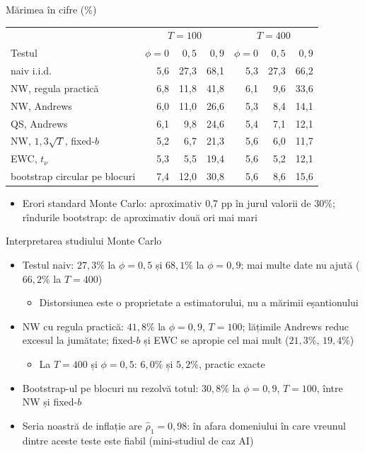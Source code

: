 \begin{frame}{Mărimea în cifre (\%)}
\itemsize{\footnotesize}
\begin{center}
\footnotesize
\begin{tabular}{lrrrrrr}
\toprule
& \multicolumn{3}{c}{$T = 100$} & \multicolumn{3}{c}{$T = 400$} \\
Testul & $\phi = 0$ & $0{,}5$ & $0{,}9$ & $\phi = 0$ & $0{,}5$ & $0{,}9$ \\
\midrule
naiv i.i.d. & 5{,}6 & 27{,}3 & 68{,}1 & 5{,}3 & 27{,}3 & 66{,}2 \\
NW, regula practică & 6{,}8 & 11{,}8 & 41{,}8 & 6{,}1 & 9{,}6 & 33{,}6 \\
NW, Andrews & 6{,}0 & 11{,}0 & 26{,}6 & 5{,}3 & 8{,}4 & 14{,}1 \\
QS, Andrews & 6{,}1 & 9{,}8 & 24{,}6 & 5{,}4 & 7{,}1 & 12{,}1 \\
NW, $1{,}3\sqrt{T}$, fixed-$b$ & 5{,}2 & 6{,}7 & 21{,}3 & 5{,}6 & 6{,}0 & 11{,}7 \\
EWC, $t_\nu$ & 5{,}3 & 5{,}5 & 19{,}4 & 5{,}6 & 5{,}2 & 12{,}1 \\
bootstrap circular pe blocuri & 7{,}4 & 12{,}0 & 30{,}8 & 5{,}6 & 8{,}6 & 15{,}6 \\
\bottomrule
\end{tabular}
\end{center}
\begin{itemize}
    \item Erori standard Monte Carlo: aproximativ 0,7 pp în jurul valorii de 30\%; rîndurile bootstrap: de aproximativ două ori mai mari
\end{itemize}
\end{frame}

\begin{frame}{Interpretarea studiului Monte Carlo}
\itemsize{\footnotesize}
\begin{itemize}
    \item Testul naiv: $27{,}3\%$ la $\phi = 0{,}5$ și $68{,}1\%$ la $\phi = 0{,}9$; mai multe date nu ajută ($66{,}2\%$ la $T = 400$)
    \begin{itemize}
        \item Distorsiunea este o proprietate a estimatorului, nu a mărimii eșantionului
    \end{itemize}
    \item NW cu regula practică: $41{,}8\%$ la $\phi = 0{,}9$, $T = 100$; lățimile Andrews reduc excesul la jumătate; fixed-$b$ și EWC se apropie cel mai mult ($21{,}3\%$, $19{,}4\%$)
    \begin{itemize}
        \item La $T = 400$ și $\phi = 0{,}5$: $6{,}0\%$ și $5{,}2\%$, practic exacte
    \end{itemize}
    \item Bootstrap-ul pe blocuri nu rezolvă totul: $30{,}8\%$ la $\phi = 0{,}9$, $T = 100$, între NW și fixed-$b$
    \item Seria noastră de inflație are $\hat\rho_1 = 0{,}98$: în afara domeniului în care vreunul dintre aceste teste este fiabil (mini-studiul de caz AI)
\end{itemize}
\end{frame}

